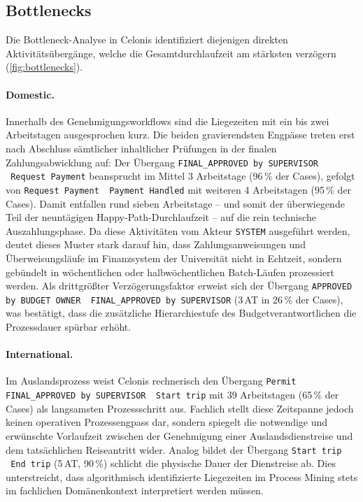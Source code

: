 \subsection{Bottlenecks}
\label{sec:bottlenecks}

Die Bottleneck-Analyse in Celonis identifiziert diejenigen direkten Aktivitätsübergänge, welche die Gesamtdurchlaufzeit am stärksten verzögern (\autoref{fig:bottlenecks}).

\paragraph{Domestic.} Innerhalb des Genehmigungsworkflows sind die Liegezeiten mit ein bis zwei Arbeitstagen ausgesprochen kurz. Die beiden gravierendsten Engpässe treten erst nach Abschluss sämtlicher inhaltlicher Prüfungen in der finalen Zahlungsabwicklung auf: Der Übergang \texttt{FINAL\_APPROVED by SUPERVISOR \textrightarrow\ Request Payment} beansprucht im Mittel 3 Arbeitstage (96\,\% der Cases), gefolgt von \texttt{Request Payment \textrightarrow\ Payment Handled} mit weiteren 4 Arbeitstagen (95\,\% der Cases). Damit entfallen rund sieben Arbeitstage – und somit der überwiegende Teil der neuntägigen Happy-Path-Durchlaufzeit – auf die rein technische Auszahlungsphase. Da diese Aktivitäten vom Akteur \texttt{SYSTEM} ausgeführt werden, deutet dieses Muster stark darauf hin, dass Zahlungsanweisungen und Überweisungsläufe im Finanzsystem der Universität nicht in Echtzeit, sondern gebündelt in wöchentlichen oder halbwöchentlichen Batch-Läufen prozessiert werden. Als drittgrößter Verzögerungsfaktor erweist sich der Übergang \texttt{APPROVED by BUDGET OWNER \textrightarrow\ FINAL\_APPROVED by SUPERVISOR} (3\,AT in 26\,\% der Cases), was bestätigt, dass die zusätzliche Hierarchiestufe des Budgetverantwortlichen die Prozessdauer spürbar erhöht.

\paragraph{International.} Im Auslandsprozess weist Celonis rechnerisch den Übergang \texttt{Permit FINAL\_APPROVED by SUPERVISOR \textrightarrow\ Start trip} mit 39 Arbeitstagen (65\,\% der Cases) als langsamsten Prozessschritt aus. Fachlich stellt diese Zeitspanne jedoch keinen operativen Prozessengpass dar, sondern spiegelt die notwendige und erwünschte Vorlaufzeit zwischen der Genehmigung einer Auslandsdienstreise und dem tatsächlichen Reiseantritt wider. Analog bildet der Übergang \texttt{Start trip \textrightarrow\ End trip} (5\,AT, 90\,\%) schlicht die physische Dauer der Dienstreise ab. Dies unterstreicht, dass algorithmisch identifizierte Liegezeiten im Process Mining stets im fachlichen Domänenkontext interpretiert werden müssen.

